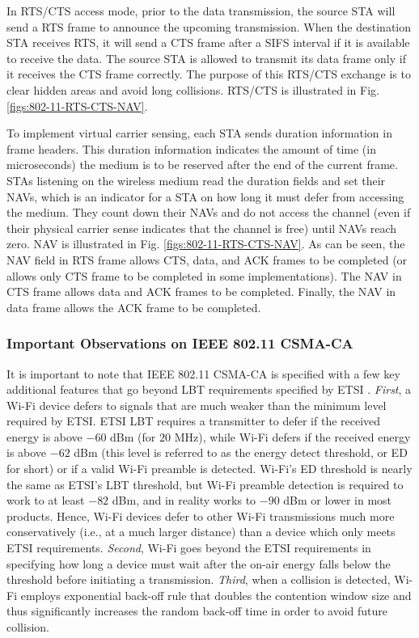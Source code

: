 \documentclass[12pt,onecolumn]{article}
\begin{document}
In RTS/CTS access mode, prior to the data transmission, the source STA will send a RTS frame to announce the upcoming transmission. When the destination STA receives RTS, it will send a CTS frame after a SIFS interval if it is available to receive the data. The source STA is allowed to transmit its data frame only if it receives the CTS frame correctly. The purpose of this RTS/CTS exchange is to clear hidden areas and avoid long collisions. RTS/CTS is illustrated in Fig. \ref{figs:802-11-RTS-CTS-NAV}.

To implement virtual carrier sensing, each STA sends duration information in frame headers. This duration information indicates the amount of time (in microseconds) the medium is to be reserved after the end of the current frame. STAs listening on the wireless medium read the duration fields and set their NAVs, which is an indicator for a STA on how long it must defer from accessing the medium. They count down their NAVs and do not access the channel (even if their physical carrier sense indicates that the channel is free) until NAVs reach zero. NAV is illustrated in Fig. \ref{figs:802-11-RTS-CTS-NAV}. As can be seen, the NAV field in RTS frame allows CTS, data, and ACK frames to be completed (or allows only CTS frame to be completed in some implementations). The NAV in CTS frame allows data and ACK frames to be completed. Finally, the NAV in data frame allows the ACK frame to be completed.

\subsubsection{Important Observations on IEEE 802.11 CSMA-CA}

It is important to note that IEEE 802.11 CSMA-CA is specified with a few key additional features that go beyond LBT requirements specified by ETSI \cite{LBT-ETSI-2014}. \textit{First}, a Wi-Fi device defers to signals that are much weaker than the minimum level required by ETSI. ETSI LBT requires a transmitter to defer if the received energy is above $-60$ dBm (for $20$ MHz), while Wi-Fi defers if the received energy is above $-62$ dBm (this level is referred to as the energy detect threshold, or ED for short) or if a valid Wi-Fi preamble is detected. Wi-Fi's ED threshold is nearly the same as ETSI's LBT threshold, but Wi-Fi preamble detection is required to work to at least $-82$ dBm, and in reality works to $-90$ dBm or lower in most products. Hence, Wi-Fi devices defer to other Wi-Fi transmissions much more conservatively (i.e., at a much larger distance) than a device which only meets ETSI requirements. \textit{Second}, Wi-Fi goes beyond the ETSI requirements in specifying how long a device must wait after the on-air energy falls below the threshold before initiating a transmission. \textit{Third}, when a collision is detected, Wi-Fi employs exponential back-off rule that doubles the contention window size and thus significantly increases the random back-off time in order to avoid future collision.
\end{document}
